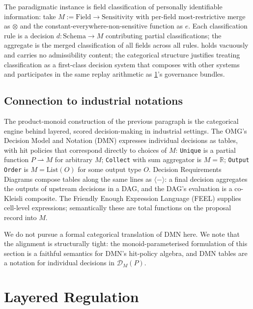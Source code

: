 \documentclass[journal,10pt]{IEEEtran}
\theoremstyle{plain}
\theoremstyle{definition}
\theoremstyle{remark}
\begin{document}
The paradigmatic instance is field classification of personally
identifiable information: take $M := \mathrm{Field} \to
\mathrm{Sensitivity}$ with per-field most-restrictive merge as
$\otimes$ and the constant-everywhere-non-sensitive function as
$e$. Each classification rule is a decision
$d \colon \mathrm{Schema} \to M$ contributing partial
classifications; the aggregate is the merged classification of
all fields across all rules.  holds vacuously
and carries no admissibility content; the categorical structure
justifies treating classification as a first-class decision
system that composes with other systems and participates in the
same replay arithmetic as \cref{sec:layered}'s governance bundles.

\subsection{Connection to industrial notations}

The product-monoid construction of the previous paragraph is the
categorical engine behind layered, scored decision-making in
industrial settings. The OMG's Decision Model and Notation (DMN)
expresses individual decisions as tables, with hit policies that
correspond directly to choices of $M$: \texttt{Unique} is a
partial function $P \rightharpoonup M$ for arbitrary $M$;
\texttt{Collect} with sum aggregator is $M = \mathbb{R}$;
\texttt{Output Order} is $M = \mathrm{List}(O)$ for some output
type $O$. Decision Requirements Diagrams compose tables along the
same lines as $\langle - \rangle$: a final decision aggregates
the outputs of upstream decisions in a DAG, and the DAG's
evaluation is a co-Kleisli composite. The Friendly Enough
Expression Language (FEEL) supplies cell-level expressions;
semantically these are total functions on the proposal record
into $M$.

We do not pursue a formal categorical translation of DMN here.
We note that the alignment is structurally tight: the
monoid-parameterised formulation of this section is a faithful
semantics for DMN's hit-policy algebra, and DMN tables are a
notation for individual decisions in $\mathcal{D}_M(P)$.

\section{Layered Regulation}
\label{sec:layered}
\end{document}

